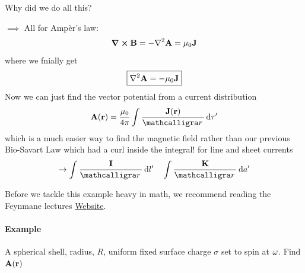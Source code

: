 \documentclass[../main.tex]{subfiles}
\begin{document}
Why did we do all this?

$\implies$ All for Amp\`er's law:
\begin{align*}
    \curl \vb B = -\laplacian \vb A = \mu_0 \vb J
\end{align*}
where we fnially get
\begin{align*}
    \boxed{
        \laplacian \vb A = -\mu_0 \vb J
    }
\end{align*}
Now we can just find the vector potential from a current distribution
\begin{align*}
    \vb A (\vb r) = \frac{\mu_0}{4\pi} \int \frac{\vb J (\vb r)}{\scriptr} \dd{\tau'}
\end{align*}
which is a much easier way to find the magnetic field rather than our previous Bio-Savart Law which had a curl inside the integral!
for line and sheet currents
\begin{align*}
    \to \int \frac{\vb I}{\scriptr} \dd{l'} \quad \int \frac{\vb K}{\scriptr} \dd{a'}
\end{align*}

Before we tackle this example heavy in math, we recommend reading the Feynmane lectures \href{https://www.feynmanlectures.caltech.edu/}{Website}.
\paragraph{Example} A spherical shell, radius, $R$, uniform fixed surface charge $\sigma$ set to spin at $\vb \omega$. Find $\vb A(\vb r)$
\end{document}
